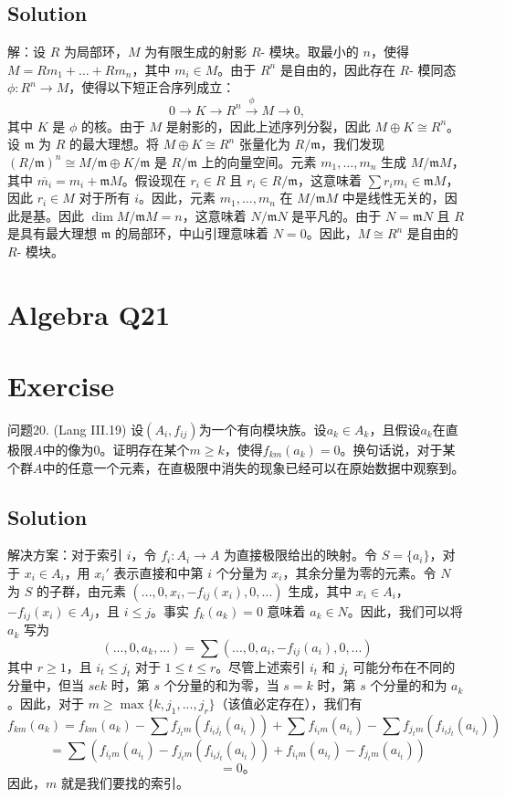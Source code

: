 \documentclass[12pt]{book}
\begin{document}
\subsection*{Solution}
解：设 $R$ 为局部环，$M$ 为有限生成的射影 $R$- 模块。取最小的 $n$，使得 $M = Rm_1 + \dots + Rm_n$，其中 $m_i \in M$。由于 $R^n$ 是自由的，因此存在 $R$- 模同态 $\phi : R^n \to M$，使得以下短正合序列成立：
\[ 0 \to K \xrightarrow{} R^n \xrightarrow{\phi} M \to 0, \]
其中 $K$ 是 $\phi$ 的核。由于 $M$ 是射影的，因此上述序列分裂，因此 $M \oplus K \cong R^n$。设 $\mathfrak{m}$ 为 $R$ 的最大理想。将 $M \oplus K \cong R^n$ 张量化为 $R/\mathfrak{m}$，我们发现 $(R/\mathfrak{m})^n \cong M/\mathfrak{m} \oplus K/\mathfrak{m}$ 是 $R/\mathfrak{m}$ 上的向量空间。元素 $m_1, \dots, m_n$ 生成 $M/\mathfrak{m}M$，其中 $\overline{m_i} = m_i + \mathfrak{m}M$。假设现在 $r_i \in R$ 且 $r_i \in R/\mathfrak{m}$，这意味着 $\sum r_i m_i \in \mathfrak{m}M$，因此 $r_i \in M$ 对于所有 $i$。因此，元素 $m_1, \dots, m_n$ 在 $M/\mathfrak{m}M$ 中是线性无关的，因此是基。因此 $\dim M/\mathfrak{m}M = n$，这意味着 $N/\mathfrak{m}N$ 是平凡的。由于 $N = \mathfrak{m}N$ 且 $R$ 是具有最大理想 $\mathfrak{m}$ 的局部环，中山引理意味着 $N = 0$。因此，$M \cong R^n$ 是自由的 $R$- 模块。
\newpage
\section{Algebra Q21}
\section*{Exercise}
问题20. (Lang III.19) 设$(A_i, f_{ij})$为一个有向模块族。设$a_k \in A_k$，且假设$a_k$在直极限$A$中的像为$0$。证明存在某个$m \ge k$，使得$f_{km}(a_k) = 0$。换句话说，对于某个群$A$中的任意一个元素，在直极限中消失的现象已经可以在原始数据中观察到。



\subsection*{Solution}
解决方案：对于索引 $i$，令 $f_i: A_i \to A$ 为直接极限给出的映射。令 $S = \{a_i\}$，对于 $x_i \in A_i$，用 $x_i'$ 表示直接和中第 $i$ 个分量为 $x_i$，其余分量为零的元素。令 $N$ 为 $S$ 的子群，由元素 $(...,0,x_i,-f_{ij}(x_i),0,...)$ 生成，其中 $x_i \in A_i$，$-f_{ij}(x_i) \in A_j$，且 $i \le j$。事实 $f_k(a_k) = 0$ 意味着 $a_k \in N$。因此，我们可以将 $a_k$ 写为
\[
(...,0,a_k,...) = \sum (...,0,a_i,-f_{ij}(a_i),0,...)
\]
其中 $r \ge 1$，且 $i_t \le j_t$ 对于 $1 \le t \le r$。尽管上述索引 $i_t$ 和 $j_t$ 可能分布在不同的分量中，但当 $s  e k$ 时，第 $s$ 个分量的和为零，当 $s = k$ 时，第 $s$ 个分量的和为 $a_k$。因此，对于 $m \ge \max\{k,j_1,...,j_r\}$（该值必定存在），我们有
\[
f_{km}(a_k) = f_{km}(a_k) - \sum f_{j_t m}(f_{i_t j_t}(a_{i_t})) + \sum f_{i_t m}(a_{i_t}) - \sum f_{j_t m}(f_{i_t j_t}(a_{i_t}))
\]
\[
= \sum (f_{i_t m}(a_{i_t}) - f_{j_t m}(f_{i_t j_t}(a_{i_t})) + f_{i_t m}(a_{i_t}) - f_{j_t m}(a_{i_t}))
\]
\[
= 0。
\]
因此，$m$ 就是我们要找的索引。
\newpage
\end{document}
